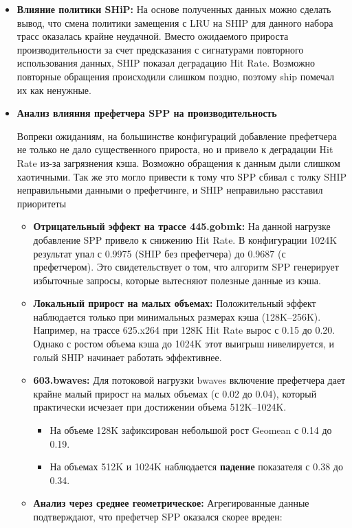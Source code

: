 \documentclass[11pt,a4paper]{article}
\begin{document}
\begin{itemize}
    \item \textbf{Влияние политики SHiP:} 
На основе полученных данных можно сделать вывод, что смена политики замещения с LRU на SHIP для данного набора трасс оказалась крайне неудачной. Вместо ожидаемого прироста производительности за счет предсказания с сигнатурами повторного использования данных, SHIP показал деградацию Hit Rate. Возможно повторные обращения происходили слишком поздно, поэтому ship помечал их как ненужные.

\item \textbf{Анализ влияния префетчера SPP на производительность}

Вопреки ожиданиям, на большинстве конфигураций добавление префетчера не только не дало существенного прироста, но и привело к деградации Hit Rate из-за загрязнения кэша. Возможно обращения к данным дыли слишком хаотичными. Так же это могло привести к тому что SPP сбивал с толку SHIP неправильными данными о префетчинге, и SHIP неправильно расставил приоритеты

\begin{itemize}
    \item \textbf{Отрицательный эффект на трассе 445.gobmk:} На данной нагрузке добавление SPP привело к  снижению Hit Rate. В конфигурации 1024K результат упал с 0.9975 (SHIP без префетчера) до 0.9687 (с префетчером). Это свидетельствует о том, что алгоритм SPP генерирует избыточные запросы, которые вытесняют полезные данные из кэша.
    
    \item \textbf{Локальный прирост на малых объемах:} Положительный эффект наблюдается только при минимальных размерах кэша (128K--256K). Например, на трассе 625.x264 при 128K Hit Rate вырос с 0.15 до 0.20. Однако с ростом объема кэша до 1024K этот выигрыш нивелируется, и голый SHIP начинает работать эффективнее.
    
    \item \textbf{603.bwaves:} Для потоковой нагрузки bwaves включение префетчера дает крайне малый прирост на малых объемах (с 0.02 до 0.04), который практически исчезает при достижении объема 512K--1024K.
\begin{itemize}
    \item На объеме 128K зафиксирован небольшой рост Geomean с 0.14 до 0.19.
    \item На объемах 512K и 1024K наблюдается \textbf{падение} показателя с 0.38 до 0.34.
\end{itemize}
\item \textbf{Анализ через среднее геометрическое:}
Агрегированные данные подтверждают, что префетчер SPP оказался скорее вреден:


\end{itemize}
\end{itemize}
\end{document}
